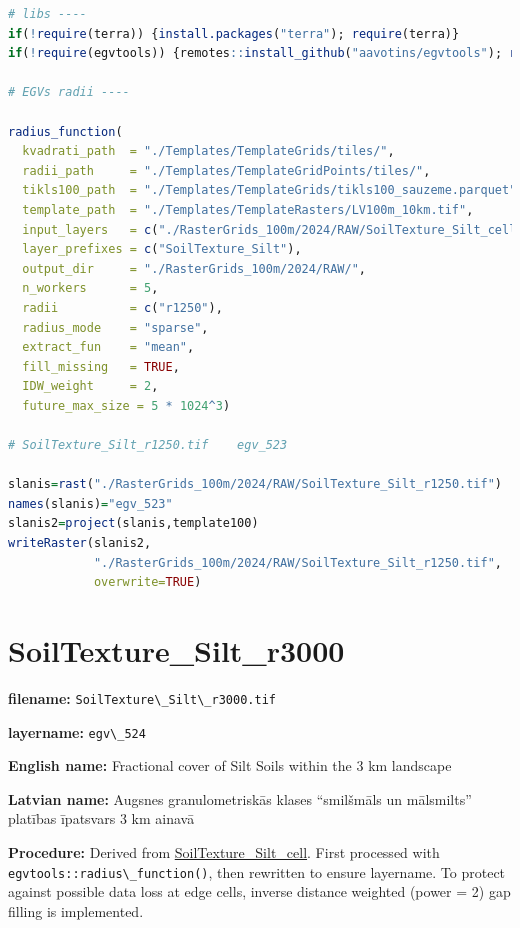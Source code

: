 \documentclass[
]{book}
\newcommand{\passthrough}[1]{#1}
\begin{document}
\begin{lstlisting}[language=R]
# libs ----
if(!require(terra)) {install.packages("terra"); require(terra)}
if(!require(egvtools)) {remotes::install_github("aavotins/egvtools"); require(egvtools)}

# EGVs radii ----

radius_function(
  kvadrati_path  = "./Templates/TemplateGrids/tiles/",
  radii_path     = "./Templates/TemplateGridPoints/tiles/",
  tikls100_path  = "./Templates/TemplateGrids/tikls100_sauzeme.parquet",
  template_path  = "./Templates/TemplateRasters/LV100m_10km.tif",
  input_layers   = c("./RasterGrids_100m/2024/RAW/SoilTexture_Silt_cell.tif"),
  layer_prefixes = c("SoilTexture_Silt"),
  output_dir     = "./RasterGrids_100m/2024/RAW/",
  n_workers      = 5,
  radii          = c("r1250"),
  radius_mode    = "sparse",
  extract_fun    = "mean",
  fill_missing   = TRUE,
  IDW_weight     = 2,
  future_max_size = 5 * 1024^3)

# SoilTexture_Silt_r1250.tif    egv_523

slanis=rast("./RasterGrids_100m/2024/RAW/SoilTexture_Silt_r1250.tif")
names(slanis)="egv_523"
slanis2=project(slanis,template100)
writeRaster(slanis2,
            "./RasterGrids_100m/2024/RAW/SoilTexture_Silt_r1250.tif",
            overwrite=TRUE)
\end{lstlisting}

\section{SoilTexture\_Silt\_r3000}\label{ch06.524}

\textbf{filename:} \passthrough{\lstinline!SoilTexture\_Silt\_r3000.tif!}

\textbf{layername:} \passthrough{\lstinline!egv\_524!}

\textbf{English name:} Fractional cover of Silt Soils within the 3 km landscape

\textbf{Latvian name:} Augsnes granulometriskās klases ``smilšmāls un mālsmilts'' platības īpatsvars 3 km ainavā

\textbf{Procedure:} Derived from \hyperref[ch06.521]{SoilTexture\_Silt\_cell}. First processed
with \passthrough{\lstinline!egvtools::radius\_function()!}, then rewritten to ensure layername. To protect against
possible data loss at edge cells, inverse distance weighted (power = 2) gap filling
is implemented.
\end{document}
